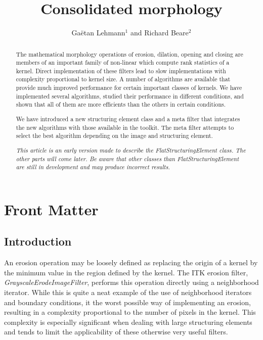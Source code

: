 \documentclass{InsightArticle}
\title{Consolidated morphology}
\author{Ga\"etan Lehmann{$^1$} {\small{and}} Richard Beare{$^2$}}
\begin{document}
\maketitle

\ifhtml
\chapter*{Front Matter\label{front}}
\fi


\begin{abstract}
\noindent
The mathematical morphology operations of erosion, dilation, opening
and closing are members of an important family of non-linear which
compute rank statistics of a kernel. Direct implementation of these
filters lead to slow implementations with complexity proportional to
kernel size. A number of algorithms are available that provide much
improved performance for certain important classes of kernels.
We have implemented several algorithms, studied
their performance in different conditions, and shown that all of them are more 
efficients than the others in certain conditions.

We have introduced a new structuring element class and a meta filter
that integrates the new algorithms with those available in the
toolkit. The meta filter attempts to select the best algorithm
depending on the image and structuring element.

{\em This article is an early version made to describe the FlatStructuringElement class.
The other parts will come later. Be aware that other classes than FlatStructuringElement
are still in development and may produce incorrect results.}
\end{abstract}

\tableofcontents

\section{Introduction}
An erosion operation may be loosely defined as replacing the origin of
a kernel by the minimum value in the region defined by the kernel. The
ITK erosion filter, {\em GrayscaleErodeImageFilter}, performs this
operation directly using a neighborhood iterator. While this is quite
a neat example of the use of neighborhood iterators and boundary
conditions, it the worst possible way of implementing an erosion,
resulting in a complexity proportional to the number of pixels in the
kernel. This complexity is especially significant when dealing with
large structuring elements and tends to limit the applicability of
these otherwise very useful filters.
\end{document}
